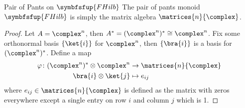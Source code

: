 \documentclass[fleqn]{NotesClass}
\makeatletter
\newcommand{\c@egory}[1]{\symbfsfup{#1}}
\newcommand{\FHilb}{\c@egory{FHilb}}
\newcommand{\isomorphic}{\cong}
\makeatother
\begin{document}
    \begin{lma}{Pair of Pants on {\normalsize\(\FHilb\)}}{}
        The pair of pants monoid \(\FHilb\) is simply the matrix algebra \(\matrices{n}{\complex}\).
        \begin{proof}
            Let \(A = \complex^n\), then \(A^* = (\complex^n)^{*} \isomorphic \complex^n\).
            Fix some orthonormal basis \(\{\ket{i}\}\) for \(\complex^n\), then \(\{\bra{i}\}\) is a basis for \((\complex^n)^*\).
            Define a map
            \begin{align}
                \varphi\colon(\complex^n)^* \otimes \complex^n &\to \matrices{n}{\complex}\\
                \bra{i} \otimes \ket{j} &\mapsto e_{ij}
            \end{align}
            where \(e_{ij} \in \matrices{n}{\complex}\) is defined as the matrix with zeros everywhere except a single entry on row \(i\) and column \(j\) which is 1.
            

\end{proof}
\end{lma}
\end{document}
